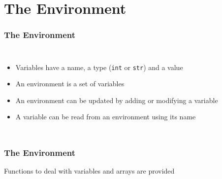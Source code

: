 \documentclass{beamer}
\begin{document}
\section{The Environment}
\begin{frame}
	\frametitle{The Environment}
	\begin{columns}
		\small
		\begin{itemize}
			\item Variables have a name, a type (\texttt{int} or \texttt{str}) and a value
			\item An environment is a set of variables
			\item An environment can be updated by adding or modifying a
				variable
			\item A variable can be read from an environment using its name
		\end{itemize}
		
		
	\end{columns}
\end{frame}

\begin{frame}
	\frametitle{The Environment}
	\small
	\centerline{Functions to deal with variables and arrays are provided}
	\begin{columns}
		\column{0.4\textwidth}
		
		
		\column{0.6\textwidth}
		
		
	\end{columns}
\end{frame}
\end{document}
